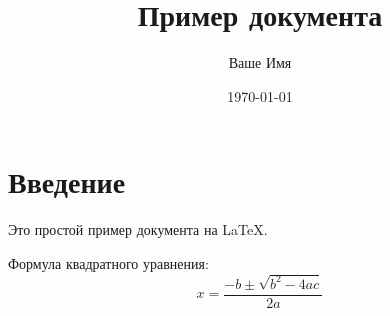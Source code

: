 \documentclass{article}
\title{Пример документа}
\author{Ваше Имя}
\date{\today}
\begin{document}
\maketitle

\section{Введение}
Это простой пример документа на \LaTeX. 

Формула квадратного уравнения:
\[
x = \frac{-b \pm \sqrt{b^2 - 4ac}}{2a}
\]
\end{document}
